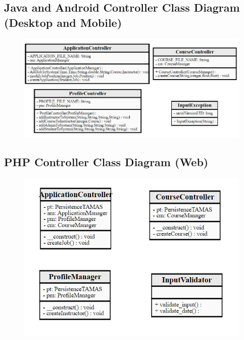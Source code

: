 \documentclass[12pt]{article}
\begin{document}
\subsection{Java and Android Controller Class Diagram (Desktop and Mobile)}
\begin{figure}[H]
	\centering
	\includegraphics[scale=0.95]{./ClassDiagrams/ControllerPackageClassDiagramJava.png}
\end{figure}
\subsection{PHP Controller Class Diagram (Web)}
\begin{figure}[H]
	\centering
	\includegraphics[scale=1.05]{./ClassDiagrams/ControllerPackageClassDiagramPHP.png}
\end{figure}
\end{document}
